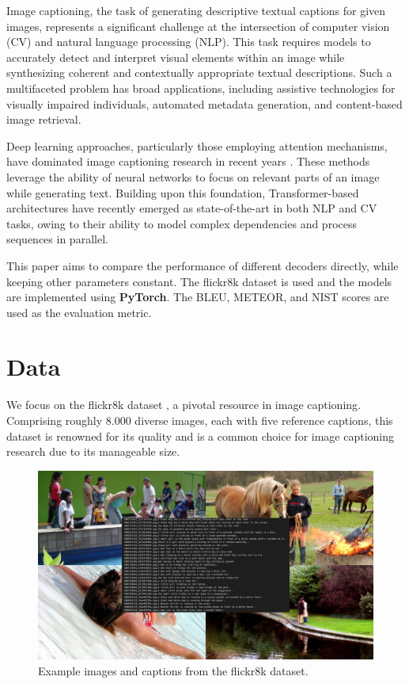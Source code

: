 \documentclass[12pt]{article}
\theoremstyle{plain}
\theoremstyle{definition}
\theoremstyle{remark}
\begin{document}
Image captioning, the task of generating descriptive textual captions for given images, represents a significant challenge at the intersection of computer vision (CV) and natural language processing (NLP). This task requires models to accurately detect and interpret visual elements within an image while synthesizing coherent and contextually appropriate textual descriptions. Such a multifaceted problem has broad applications, including assistive technologies for visually impaired individuals, automated metadata generation, and content-based image retrieval.
\par Deep learning approaches, particularly those employing attention mechanisms, have dominated image captioning research in recent years \cite{xu2015show}. These methods leverage the ability of neural networks to focus on relevant parts of an image while generating text. Building upon this foundation, Transformer-based architectures \cite{vaswani2017attention} have recently emerged as state-of-the-art in both NLP and CV tasks, owing to their ability to model complex dependencies and process sequences in parallel.
\par This paper aims to compare the performance of different decoders directly, while keeping other parameters constant. The flickr8k dataset is used and the models are implemented using \textbf{PyTorch}. The BLEU, METEOR, and NIST scores are used as the evaluation metric.



\section{Data}\label{sec:data}
We focus on the flickr8k dataset \cite{hodosh2013flickr8k}, a pivotal resource in image captioning. Comprising roughly 8.000 diverse images, each with five reference captions, this dataset is renowned for its quality and is a common choice for image captioning research due to its manageable size.

\begin{figure}[H]
    \centering
    \includegraphics[width=.9\textwidth]{res/flickr8k.png}
    \caption{Example images and captions from the flickr8k dataset.}
    \label{fig:flickr8k}
\end{figure}
\end{document}
